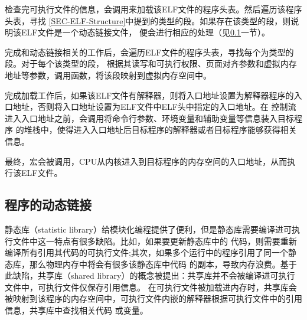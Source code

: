 检查完可执行文件的信息，会调用来加载该ELF文件的程序头表。然后遍历该程序头表，寻找
\ref{SEC-ELF-Structure}中提到的类型的段。如果存在该类型的段，则说明该ELF文件是一个动态链接文件，
便会进行相应的处理（见\ref{SEC-ELF-DynamicLink}一节）。

完成和动态链接相关的工作后，会遍历ELF文件的程序头表，寻找每个为类型的段。对于每个该类型的段，
根据其读写和可执行权限、页面对齐参数和虚拟内存地址等参数，调用函数，将该段映射到虚拟内存空间中。

完成加载工作后，如果该ELF文件有解释器，则将入口地址设置为解释器程序的入口地址，否则将入口地址设置为ELF文件中ELF头中指定的入口地址。在
控制流进入入口地址之前，会调用将命令行参数、环境变量和辅助变量等信息装入目标程序
的堆栈中，使得进入入口地址后目标程序的解释器或者目标程序能够获得相关信息。

最终，宏会被调用，CPU从内核进入到目标程序的内存空间的入口地址，从而执行该ELF文件。





\subsection{程序的动态链接}
\label{SEC-ELF-DynamicLink}

静态库（statistic library）给模块化编程提供了便利，但是静态库需要编译进可执行文件中这一特点有很多缺陷。比如，如果要更新静态库中的
代码，则需要重新编译所有引用其代码的可执行文件;其次，如果多个运行中的程序引用了同一个静态库，那么物理内存中将会有很多该静态库中代码
的副本，导致内存浪费。基于此缺陷，共享库（shared library）的概念被提出：共享库并不会被编译进可执行文件中，可执行文件仅保存引用信息。
在可执行文件被加载进内存时，共享库会被映射到该程序的内存空间中，可执行文件内嵌的解释器根据可执行文件中的引用信息，共享库中查找相关代码
或变量。
